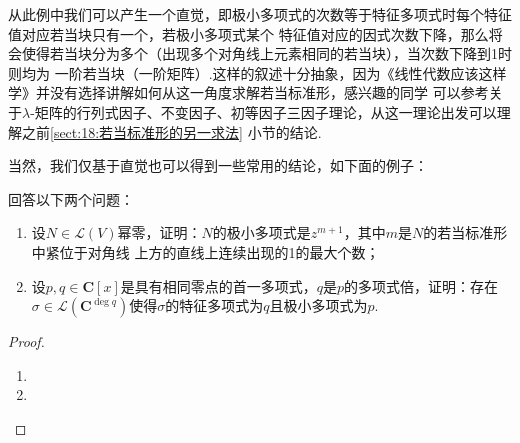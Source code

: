 从此例中我们可以产生一个直觉，即极小多项式的次数等于特征多项式时每个特征值对应若当块只有一个，若极小多项式某个
特征值对应的因式次数下降，那么将会使得若当块分为多个（出现多个对角线上元素相同的若当块），当次数下降到1时则均为
一阶若当块（一阶矩阵）.这样的叙述十分抽象，因为《线性代数应该这样学》并没有选择讲解如何从这一角度求解若当标准形，感兴趣的同学
可以参考关于$\lambda$-矩阵的行列式因子、不变因子、初等因子三因子理论，从这一理论出发可以理解之前\autoref{sect:18:若当标准形的另一求法}
小节的结论.

当然，我们仅基于直觉也可以得到一些常用的结论，如下面的例子：
\begin{example}
    回答以下两个问题：
    \begin{enumerate}[label=(\arabic*)]
        \item 设$N\in \mathcal{L}(V)$幂零，证明：$N$的极小多项式是$z^{m+1}$，其中$m$是$N$的若当标准形中紧位于对角线
        上方的直线上连续出现的1的最大个数；

        \item 设$p,q\in\mathbf{C}[x]$是具有相同零点的首一多项式，$q$是$p$的多项式倍，证明：存在
        $\sigma\in \mathcal{L}(\mathbf{C}^{\deg q})$使得$\sigma$的特征多项式为$q$且极小多项式为$p$.
    \end{enumerate}
\end{example}
\begin{proof}
    \begin{enumerate}[label=(\arabic*)]
        \item 
        \item 
    \end{enumerate}
\end{proof}

